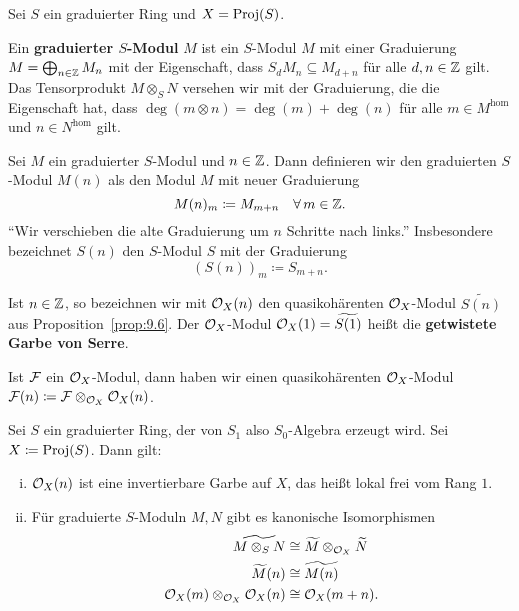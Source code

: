 \begin{defn}
\label{defn:11.11}
	Sei $S$ ein graduierter Ring und $X = \operatorname{Proj}(S)$.
	\item Ein \textbf{graduierter $S$-Modul} $M$ ist ein $S$-Modul $M$ mit einer Graduierung $M=\bigoplus_{n\in \mathbb {Z}}M_n$ mit der Eigenschaft, dass $S_dM_n \subseteq M_{d+n}$ für alle $d,n  \in \mathbb {Z}$ gilt. Das Tensorprodukt $M\otimes_S N$ versehen wir mit der Graduierung, die die Eigenschaft hat, dass $\deg(m\otimes n) = \deg(m)+\deg(n)$ für alle $m \in M^\text{hom}$ und $n \in N^\text{hom}$ gilt.
	\item Sei $M$ ein graduierter $S$-Modul und $n \in \mathbb {Z}$. Dann definieren wir den graduierten $S$-Modul $M(n)$ als den Modul $M$ mit neuer Graduierung
	\[
		M(n)_m \coloneqq M_{m+n} \quad \forall\, m \in \mathbb {Z}.
	\]
	\enquote{Wir verschieben die alte Graduierung um $n$ Schritte nach links.} Insbesondere bezeichnet $S(n)$ den $S$-Modul $S$ mit der Graduierung
	\[
		(S(n))_m\coloneqq S_{m+n}.
	\]
	\item Ist $n \in \mathbb {Z}$, so bezeichnen wir mit $\mathcal{O}_X(n)$ den quasikohärenten $\mathcal{O}_X$-Modul $\widetilde{S(n)}$ aus Proposition~\ref{prop:9.6}. Der $\mathcal{O}_X$-Modul $\mathcal{O}_X(1) = \widetilde{S(1)}$ heißt die \textbf{getwistete Garbe von Serre}.
	\item Ist $\mathcal{F}$ ein $\mathcal{O}_X$-Modul, dann haben wir einen quasikohärenten $\mathcal{O}_X$-Modul $\mathcal{F}(n)\coloneqq \mathcal{F} \otimes_{\mathcal{O}_X}\mathcal{O}_X(n)$.
\end{defn}

\begin{prop}
\label{prop:11.12}
	Sei $S$ ein graduierter Ring, der von $S_1$ also $S_0$-Algebra erzeugt wird. Sei $X\coloneqq \operatorname{Proj}(S)$. Dann gilt:
	\begin{enumerate}[i)]
		\item $\mathcal{O}_X(n)$ ist eine invertierbare Garbe auf $X$, das heißt lokal frei vom Rang $1$.
		\item Für graduierte $S$-Moduln $M,N$ gibt es kanonische Isomorphismen
		\begin{align*}
			\widetilde{M\otimes_S N} & \cong \widetilde{M}\otimes_{\mathcal{O}_X} \widetilde{N}\\
			\widetilde{M}(n) & \cong \widetilde{M(n)}\\
			\mathcal{O}_X(m)\otimes_{\mathcal{O}_X} \mathcal{O}_X(n) &\cong \mathcal{O}_X(m+n).
		\end{align*}
	\end{enumerate}
\end{prop}

